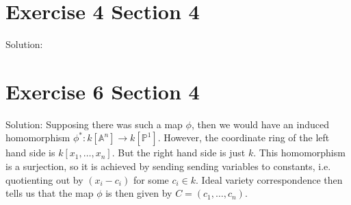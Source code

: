 \documentclass{article}
\begin{document}
\section*{Exercise 4 Section 4}

Solution: 


\section{Exercise 6 Section 4}

Solution: Supposing there was such a map $\phi$, then we would have an induced homomorphism 
$\phi^*: k[\mathbb{A}^n] \rightarrow k[\mathbb{P}^1]$.
However, the coordinate ring of the left hand side is $k[x_1, \ldots, x_n]$. But the right hand side is just $k$. This homomorphism
is a surjection, so it is achieved by sending sending variables to constants, i.e. quotienting out by $(x_i - c_i)$ for some
$c_i \in k$. Ideal variety correspondence then tells us that the map $\phi$ is then given by $C = (c_1, \ldots, c_n)$.
\end{document}
